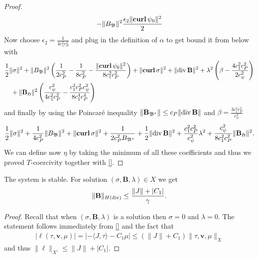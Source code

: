 \documentclass[../master_thesis.tex]{subfiles}
\begin{document}
\begin{proof}
\begin{align*}
        - \lVert B_\mathfrak{B} \rVert^2 \frac{ \epsilon_2 \lVert  \veccurl \psi_0 \rVert^2 }{2}
    \end{align*}
    Now choose $\epsilon_2 = \frac{1}{4 c_1^2 c_P^2}$ and plug in the definition of $\alpha$
    to get bound it from below with
    \begin{align*}
        &\frac{1}{2} \lVert \sigma \rVert^2 + \lVert B_\mathfrak{B} \rVert^2 
        \left( \frac{1}{2 c_P^2} - \frac{1}{8 c_P^2} 
        - \frac{\lVert  \veccurl \psi_0 \rVert^2}{8 c_1^2 c_P^2} \right)
        + \lVert  \veccurl \sigma \rVert^2 + \lVert \diver \mathbf{B} \rVert ^2
        + \lambda ^2 \left( \beta - \frac{4 c_1^2 c_P^2}{2 c_\psi^2} \right)
        \\ &\quad+ \lVert \mathbf{B}_\mathfrak{H} \rVert^2  \left( \frac{c_\psi^2}{4 c_1^2 c_P^2 }
        - \frac{ c_1^2 c_P^2 c_\psi^2}{8 c_1^4 c_P^4} \right)
    \end{align*}
    and finally by using the Poincaré inequality $\lVert \mathbf{B}_{\mathfrak{B}^*} \rVert 
    \leq c_P \lVert \diver \mathbf{B} \rVert$
    and $\beta = \frac{3 c_1^2 c_P^2}{c_\psi^2}$
    \begin{align*}
        \frac{1}{2} \lVert \sigma \rVert^2 + \frac{1}{4 c_P^2}\lVert B_\mathfrak{B} \rVert^2 
        + \lVert  \veccurl \sigma \rVert^2
        + \frac{1}{2 c_P^2 B_{\mathfrak{B}^*}} 
        + \frac{1}{2} \lVert \diver \mathbf{B} \rVert ^2
        + \frac{c_1^2 c_P^2}{c_\psi^2}\lambda^2
        + \frac{c_\psi^2}{8 c_1^2 c_P^2} \lVert \mathbf{B}_\mathfrak{H} \rVert^2.
    \end{align*}
    We can define now $\eta$ by taking the minimum of all these coefficients and 
    thus we proved $T$-coercivity together with \ref{}. 
\end{proof}

\begin{theorem}[Stability]
    The system is stable. For solution $(\sigma, \mathbf{B},\lambda) \in X$
    we get 
    \begin{align*}
        \lVert \mathbf{B} \rVert _{H(\diver)} 
        \leq \frac{\lVert J \rVert + |C_1|}{\gamma}.
    \end{align*}
\end{theorem}
\begin{proof}
    Recall that when $(\sigma, \mathbf{B},\lambda)$ is a solution 
    then $\sigma = 0$ and $\lambda = 0$.
    The statement follows immediately from \ref{} and the fact that 
    \begin{align*}
        | \ell(\tau,\mathbf{v},\mu) |
        = | - \langle J, \tau \rangle - C_1 \mu | 
        \leq (\lVert J \rVert + C_1) \lVert \tau,\mathbf{v},\mu \rVert _X
    \end{align*}
    and thus $\lVert \ell \rVert _{X'} \leq \lVert J \rVert + | C_1 |$.
\end{proof}
\end{document}
